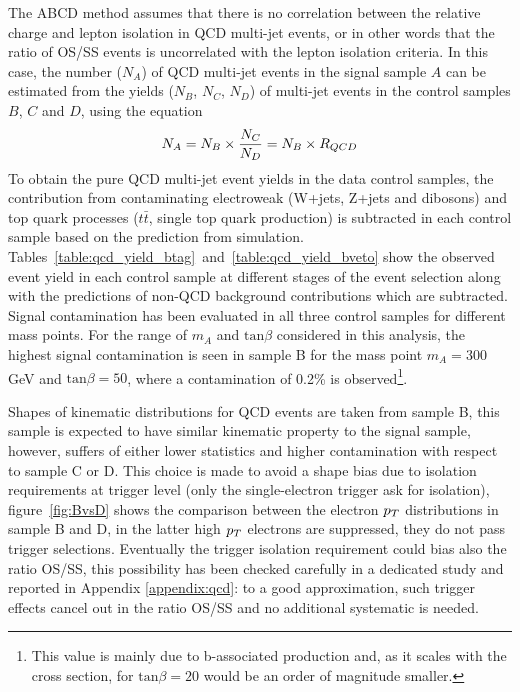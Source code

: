 The ABCD method assumes that there is no correlation between the relative 
charge and lepton isolation in QCD multi-jet events, or in other words that the ratio of OS/SS events is uncorrelated 
with the lepton isolation criteria. In this case, the number ($N_{A}$) of QCD multi-jet events in the signal sample $A$ 
can be estimated from the yields ($N_B$, $N_C$, $N_D$)  of multi-jet events in the control samples $B$, $C$ and $D$, using the equation
\begin{equation} \label{eqn:qcdest}
N_{A}  = N_{B} \times \frac{N_{C}}{N_{D}} =  N_{B} \times R_{QCD}
\end{equation}
To obtain the pure QCD multi-jet event yields in the data control samples, the contribution 
from contaminating electroweak (W+jets, Z+jets and dibosons) and top quark processes
($t\bar{t}$,  single top quark production) is  subtracted in each control sample based 
on the prediction from simulation.
Tables~\ref{table:qcd_yield_btag}~and~\ref{table:qcd_yield_bveto}
show the observed event yield in each control sample at different stages of the event selection along with the
predictions of non-QCD background contributions  which are subtracted.
Signal contamination has been evaluated in all  three control samples for different 
mass points. For the range of $m_{A}$ and $\mathrm{tan}\beta$ considered in this analysis, the highest signal contamination 
is seen in sample B for the mass point $m_{A} = 300$ GeV and $\mathrm{tan}\beta = 50$, where  a contamination 
of 0.2\% is observed\footnote
{
This value is mainly due to b-associated production and,
as it scales with the cross section, for $\mathrm{tan}\beta = 20$ would be an order of magnitude smaller.
}.

Shapes of kinematic distributions for QCD events are taken from 
sample B, this sample is expected to have similar kinematic property to the signal sample, however, suffers of either lower statistics 
and higher contamination with respect to sample C or D.
This choice is made to avoid a shape bias due to isolation requirements at trigger level (only the single-electron trigger ask for isolation),
figure~\ref{fig:BvsD} shows the comparison between the electron $p_{T}$ distributions in sample B and D, 
in the latter high $p_{T}$ electrons are suppressed, they do not pass trigger selections. 
Eventually the trigger isolation requirement could
bias also the ratio OS/SS, this possibility has been checked carefully
in a dedicated study and reported in Appendix \ref{appendix:qcd}:
to a good approximation, such trigger effects cancel out in the ratio
OS/SS and no additional systematic is needed.

